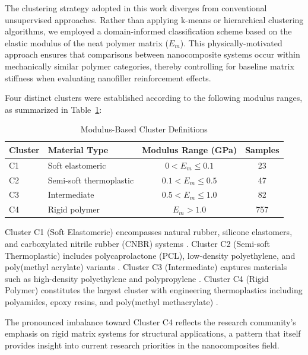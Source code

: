 \documentclass[conference]{IEEEtran}
\begin{document}
The clustering strategy adopted in this work diverges from conventional unsupervised approaches. Rather than applying k-means or hierarchical clustering algorithms, we employed a domain-informed classification scheme based on the elastic modulus of the neat polymer matrix ($E_m$). This physically-motivated approach ensures that comparisons between nanocomposite systems occur within mechanically similar polymer categories, thereby controlling for baseline matrix stiffness when evaluating nanofiller reinforcement effects.

Four distinct clusters were established according to the following modulus ranges, as summarized in Table~\ref{tab:clusters}:

\begin{table}[htbp]
\caption{Modulus-Based Cluster Definitions}
\begin{center}
\begin{tabular}{@{}llcc@{}}
\toprule
Cluster & Material Type & Modulus Range (GPa) & Samples \\
\midrule
C1 & Soft elastomeric & $0 < E_m \leq 0.1$ & 23 \\
C2 & Semi-soft thermoplastic & $0.1 < E_m \leq 0.5$ & 47 \\
C3 & Intermediate & $0.5 < E_m \leq 1.0$ & 82 \\
C4 & Rigid polymer & $E_m > 1.0$ & 757 \\
\bottomrule
\end{tabular}
\label{tab:clusters}
\end{center}
\end{table}

Cluster C1 (Soft Elastomeric) encompasses natural rubber, silicone elastomers, and carboxylated nitrile rubber (CNBR) systems \cite{abhisha2020effect}. Cluster C2 (Semi-soft Thermoplastic) includes polycaprolactone (PCL), low-density polyethylene, and poly(methyl acrylate) variants \cite{kassa2020effects, carli2011phbv}. Cluster C3 (Intermediate) captures materials such as high-density polyethylene and polypropylene \cite{ebadi2015experimental, esmizadeh2018fabrication}. Cluster C4 (Rigid Polymer) constitutes the largest cluster with engineering thermoplastics including polyamides, epoxy resins, and poly(methyl methacrylate) \cite{wilkinson2007tensile, gabr2018mechanical, stojsic2016study}.

The pronounced imbalance toward Cluster C4 reflects the research community's emphasis on rigid matrix systems for structural applications, a pattern that itself provides insight into current research priorities in the nanocomposites field.
\end{document}

